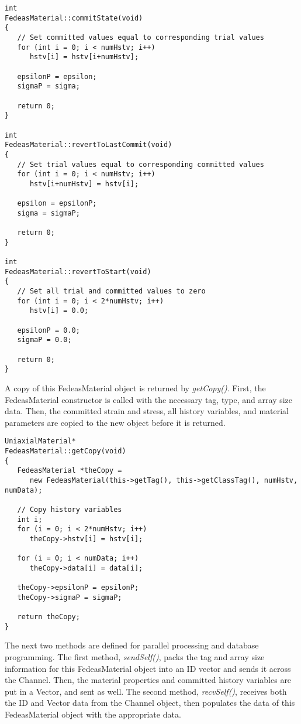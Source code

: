\documentclass[12pt]{article}
\begin{document}
{\sf\small
\begin{verbatim}
int
FedeasMaterial::commitState(void)
{
   // Set committed values equal to corresponding trial values
   for (int i = 0; i < numHstv; i++)
      hstv[i] = hstv[i+numHstv];
     
   epsilonP = epsilon;
   sigmaP = sigma;
     
   return 0;
}

int
FedeasMaterial::revertToLastCommit(void)
{
   // Set trial values equal to corresponding committed values
   for (int i = 0; i < numHstv; i++)
      hstv[i+numHstv] = hstv[i];
     
   epsilon = epsilonP;
   sigma = sigmaP;
     
   return 0;
}

int
FedeasMaterial::revertToStart(void)
{
   // Set all trial and committed values to zero
   for (int i = 0; i < 2*numHstv; i++)
      hstv[i] = 0.0;
     
   epsilonP = 0.0;
   sigmaP = 0.0;
     
   return 0;
}
\end{verbatim}
}

\noindent A copy of this FedeasMaterial object is returned by {\em getCopy()}. First, the
FedeasMaterial constructor is called with the necessary tag, type, and array size data.
Then, the committed strain and stress, all history variables, and material parameters
are copied to the new object before it is returned.

{\sf\small
\begin{verbatim}
UniaxialMaterial*
FedeasMaterial::getCopy(void)
{
   FedeasMaterial *theCopy = 
      new FedeasMaterial(this->getTag(), this->getClassTag(), numHstv, numData);
     
   // Copy history variables
   int i;
   for (i = 0; i < 2*numHstv; i++)
      theCopy->hstv[i] = hstv[i];
     
   for (i = 0; i < numData; i++)
      theCopy->data[i] = data[i];
     
   theCopy->epsilonP = epsilonP;
   theCopy->sigmaP = sigmaP;
     
   return theCopy;
}
\end{verbatim}
}

\noindent The next two methods are defined for parallel processing and database programming.
The first method, {\em sendSelf()}, packs the tag and array size information for this FedeasMaterial
object into an ID vector and sends it across the Channel. Then, the material properties and 
committed history variables are put in a Vector, and sent as well.
The second method, {\em recvSelf()}, receives both the ID and Vector data from the Channel object, 
then populates the data of this FedeasMaterial object with the appropriate data.
\end{document}
